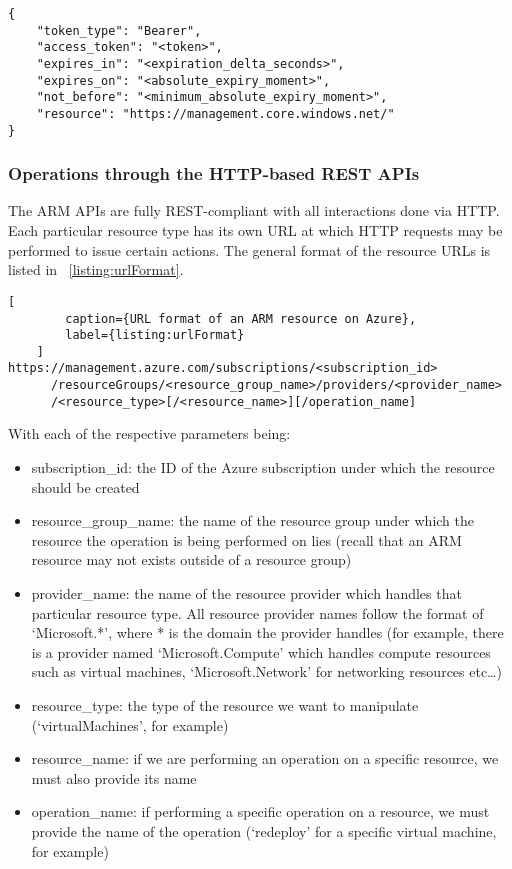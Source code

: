 \documentclass[11pt]{report}
\begin{document}
\begin{listing}[H]
\caption{Structure of token response.}
\label{listing:tokenResponse}
\begin{verbatim}
{
    "token_type": "Bearer",
    "access_token": "<token>",
    "expires_in": "<expiration_delta_seconds>",
    "expires_on": "<absolute_expiry_moment>",
    "not_before": "<minimum_absolute_expiry_moment>",
    "resource": "https://management.core.windows.net/"
}
\end{verbatim}
\end{listing}

\subsubsection{Operations through the HTTP-based REST APIs}

The ARM APIs are fully REST-compliant with all interactions done via HTTP\@. Each
particular resource type has its own URL at which HTTP requests may be
performed to issue certain actions. The general format of the resource URLs is
listed in ~\ref{listing:urlFormat}.

\begin{lstlisting}[
        caption={URL format of an ARM resource on Azure},
        label={listing:urlFormat}
    ]
https://management.azure.com/subscriptions/<subscription_id>
      /resourceGroups/<resource_group_name>/providers/<provider_name>
      /<resource_type>[/<resource_name>][/operation_name]
\end{lstlisting}

With each of the respective parameters being:

\begin{itemize}
    \item{subscription\_id}: the ID of the Azure subscription under which the
        resource should be created
    \item{resource\_group\_name}: the name of the resource group under which
        the resource the operation is being performed on lies (recall that an
        ARM resource may not exists outside of a resource group)
    \item{provider\_name}: the name of the resource provider which handles that
        particular resource type. All resource provider names follow the format
        of `Microsoft.*', where * is the domain the provider handles (for
        example, there is a provider named `Microsoft.Compute' which handles
        compute resources such as virtual machines, `Microsoft.Network' for
        networking resources etc\ldots)
    \item{resource\_type}: the type of the resource we want to manipulate
        (`virtualMachines', for example)
    \item{resource\_name}: if we are performing an operation on a specific
        resource, we must also provide its name
    \item{operation\_name}: if performing a specific operation on a resource,
        we must provide the name of the operation (`redeploy' for a specific
        virtual machine, for example)
\end{itemize}
\end{document}
